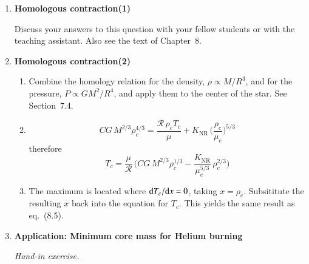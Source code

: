 \documentclass[11pt,a4paper,fleqn]{report}
\begin{document}

\begin{enumerate}


\item {\bf Homologous contraction(1)} 

  Discuss your answers to this question with your fellow students or
  with the teaching assistant. Also see the text of Chapter~8.

\item {\bf Homologous contraction(2)} 

  \begin{enumerate}

  \item Combine the homology relation for the density, $\rho \propto
    M/R^3$, and for the pressure, $P \propto G M^2/R^4$, and apply
    them to the center of the star. See Section~7.4.
    
  \item     
    \[
    C G\, M^{2/3} \rho_c^{4/3} = \frac{\mathcal{R}\, \rho_c T_c}{\mu} +
    K_\mathrm{NR}\, \Bigg( \frac{\rho_c}{\mu_e} \Bigg)^{5/3}
    \] therefore
    \[
    T_c = \frac{\mu}{\mathcal{R}}\, \Bigg( C G\, M^{2/3} \rho_c^{1/3}
    - \frac{K_\mathrm{NR}}{\mu_e^{5/3}}\, \rho_c^{2/3} \Bigg)
    \]

  \item The maximum is located where $\mathrm{d} T_c/\mathrm{d} x = 0$, taking $x
    = \rho_c$. Subsititute the resulting $x$ back into the equation
    for $T_c$. This yields the same result as eq.~(8.5).

  \end {enumerate} 
  

\item {\bf Application: Minimum core mass for Helium burning}

  \emph{Hand-in exercise.}


\end{enumerate}
\end{document}
